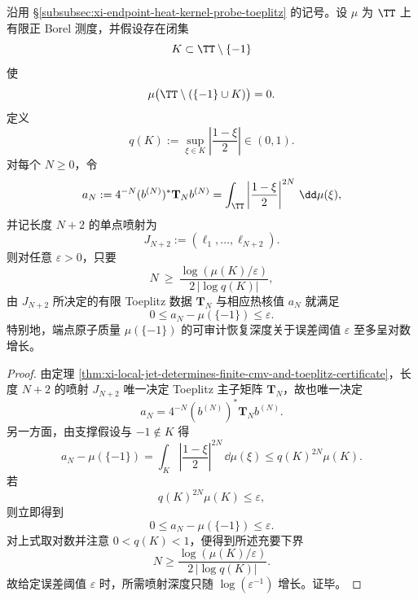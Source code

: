 \begin{theorem}[端点原子质量的有限喷射证书深度呈对数级]\label{thm:xi-point-atom-endpoint-jet-depth-logarithmic}
沿用 \S\ref{subsubsec:xi-endpoint-heat-kernel-probe-toeplitz} 的记号。设 \(\mu\) 为 \(\TT\) 上有限正 Borel 测度，并假设存在闭集
\[
K\subset \TT\setminus\{-1\}
\]
使
\[
\mu\bigl(\TT\setminus(\{-1\}\cup K)\bigr)=0.
\]
定义
\[
q(K):=\sup_{\xi\in K}\left|\frac{1-\xi}{2}\right|\in(0,1).
\]
对每个 \(N\ge 0\)，令
\[
a_N:=4^{-N}(b^{(N)})^\ast \mathbf T_N b^{(N)}
=\int_{\TT}\left|\frac{1-\xi}{2}\right|^{2N}\,\dd\mu(\xi),
\]
并记长度 \(N+2\) 的单点喷射为
\[
J_{N+2}:=(\ell_1,\dots,\ell_{N+2}).
\]
则对任意 \(\varepsilon>0\)，只要
\[
\boxed{\;
N\ \ge\ \frac{\log(\mu(K)/\varepsilon)}{2\,|\log q(K)|},
\;}
\]
由 \(J_{N+2}\) 所决定的有限 Toeplitz 数据 \(\mathbf T_N\) 与相应热核值 \(a_N\) 就满足
\[
\boxed{\;
0\le a_N-\mu(\{-1\})\le \varepsilon.
\;}
\]
特别地，端点原子质量 \(\mu(\{-1\})\) 的可审计恢复深度关于误差阈值 \(\varepsilon\) 至多呈对数增长。
\end{theorem}
\begin{proof}
由定理 \ref{thm:xi-local-jet-determines-finite-cmv-and-toeplitz-certificate}，长度 \(N+2\) 的喷射 \(J_{N+2}\) 唯一决定 Toeplitz 主子矩阵 \(\mathbf T_N\)，故也唯一决定
\[
a_N=4^{-N}(b^{(N)})^\ast \mathbf T_N b^{(N)}.
\]
另一方面，由支撑假设与 \(-1\notin K\) 得
\[
a_N-\mu(\{-1\})
=\int_K\left|\frac{1-\xi}{2}\right|^{2N}\,\dd\mu(\xi)
\le q(K)^{2N}\mu(K).
\]
若
\[
q(K)^{2N}\mu(K)\le \varepsilon,
\]
则立即得到
\[
0\le a_N-\mu(\{-1\})\le \varepsilon.
\]
对上式取对数并注意 \(0<q(K)<1\)，便得到所述充要下界
\[
N\ge \frac{\log(\mu(K)/\varepsilon)}{2\,|\log q(K)|}.
\]
故给定误差阈值 \(\varepsilon\) 时，所需喷射深度只随 \(\log(\varepsilon^{-1})\) 增长。证毕。
\end{proof}
